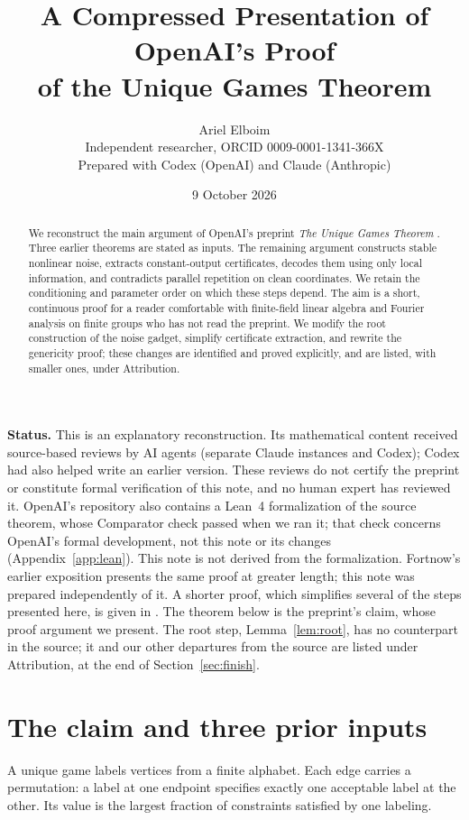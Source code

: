 \documentclass[11pt]{article}
\title{A Compressed Presentation of OpenAI's Proof\\ of the Unique Games Theorem}
\author{Ariel Elboim\\\small Independent researcher, ORCID 0009-0001-1341-366X\\\small Prepared with Codex (OpenAI) and Claude (Anthropic)}
\date{9 October 2026}
\begin{document}
\maketitle
\begin{abstract}
We reconstruct the main argument of OpenAI's preprint \emph{The Unique
Games Theorem} \cite{UGT}. Three earlier theorems are stated as inputs.
The remaining argument constructs stable nonlinear noise, extracts
constant-output certificates, decodes them using only local information,
and contradicts parallel repetition on clean coordinates. We retain the
conditioning and parameter order on which these steps depend. The aim is
a short, continuous proof for a reader comfortable with finite-field
linear algebra and Fourier analysis on finite groups who has not read the
preprint. We modify the root construction of the noise gadget, simplify
certificate extraction, and rewrite the genericity proof; these changes
are identified and proved explicitly, and are listed, with smaller ones,
under Attribution.
\end{abstract}

\noindent\textbf{Status.}
This is an explanatory reconstruction. Its mathematical content
received source-based reviews by AI agents (separate Claude instances and
Codex); Codex had also helped write an earlier version. These reviews do
not certify the preprint or constitute formal verification of this note,
and no human expert has reviewed it. OpenAI's repository also contains a
Lean~4 formalization of the source theorem, whose Comparator check
passed when we ran it; that check concerns OpenAI's formal development,
not this note or its changes (Appendix~\ref{app:lean}). This note is not
derived from the formalization. Fortnow's earlier exposition
\cite{Fortnow} presents the same proof at greater length; this note was
prepared independently of it. A shorter proof, which simplifies several
of the steps presented here, is given in \cite{ShortProof}. The theorem below is the preprint's claim,
whose proof argument we present. The root step, Lemma~\ref{lem:root},
has no counterpart in the source; it and our other departures from the
source are listed under Attribution, at the end of
Section~\ref{sec:finish}.

\section{The claim and three prior inputs}

A unique game labels vertices from a finite alphabet. Each edge carries
a permutation: a label at one endpoint specifies exactly one acceptable
label at the other. Its value is the largest fraction of constraints
satisfied by one labeling.
\end{document}
